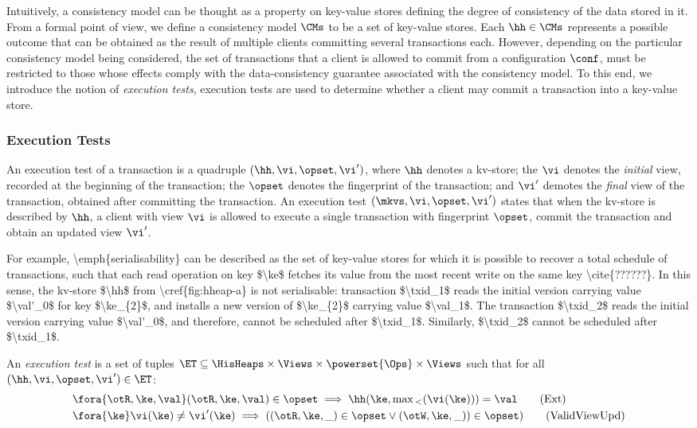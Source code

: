 Intuitively, a consistency model can be thought as a property on key-value stores 
defining the degree of consistency of the data stored in it.
From a formal point of view, we define a consistency model 
$\CMs$ to be a set of key-value stores.  
Each $\hh \in \CMs$ represents a possible outcome that 
can be obtained as the result of multiple clients committing several transactions each. 
However, depending on the particular consistency model being considered, the set of transactions that a client is allowed to commit  
from a configuration $\conf$, must be restricted to those whose effects comply with the data-consistency guarantee associated with 
the consistency model. 
To this end, we introduce the notion of \emph{execution tests}, 
execution tests are used to determine whether a client may commit a transaction into a key-value store.

\subsubsection{Execution Tests}
An execution test of a transaction is a quadruple $(\hh, \vi, \opset, \vi')$, where $\hh$ denotes a kv-store;
the $\vi$ denotes the \emph{initial} view, recorded at the beginning of the transaction; 
the $\opset$ denotes the fingerprint of the transaction; and 
$\vi'$ demotes the \emph{final} view of the transaction, obtained after committing the transaction. 
An execution test $(\mkvs, \vi, \opset, \vi')$ states that when the kv-store is described by $\hh$, a client with view $\vi$ is allowed to execute a single transaction with fingerprint $\opset$, commit the transaction and obtain an updated view $\vi'$. 

\ac{
For example, \emph{serialisability} can be described as the set 
of key-value stores for which it is possible to recover a total schedule of transactions, 
such that each read operation on key $\ke$ fetches its value from the 
most recent write on the same key \cite{??????}.
In this sense, the kv-store $\hh$ from \cref{fig:hheap-a} is not serialisable: 
transaction $\txid_1$ reads the initial version carrying value $\val'_0$ for key $\ke_{2}$, 
and installs a new version of $\ke_{2}$ carrying value $\val_1$. The transaction $\txid_2$ 
reads the initial version carrying value $\val'_0$, and therefore, 
cannot be scheduled after $\txid_1$. Similarly, $\txid_2$ cannot be scheduled after $\txid_1$.
}

\begin{definition}
\label{def:execution.test}
An \emph{execution test} is a set of tuples $\ET \subseteq \HisHeaps \times \Views \times \powerset{\Ops} \times \Views$ 
such that for all $(\hh, \vi, \opset, \vi') \in \ET$:
\begin{align}
    & \fora{\otR, \ke, \val} (\otR, \ke, \val) \in \opset \implies \hh(\ke, \max{}_{<}(\vi(\ke))) = \val \tag{Ext} \label{eq:read-external} \\
    & \fora{\ke} \vi(\ke) \neq \vi'(\ke) \implies
    ( (\otR, \ke, \_) \in \opset \vee (\otW, \ke, \_)) \in \opset) \tag{ValidViewUpd} \label{eq:valid-view-update}
\end{align}
\end{definition}

